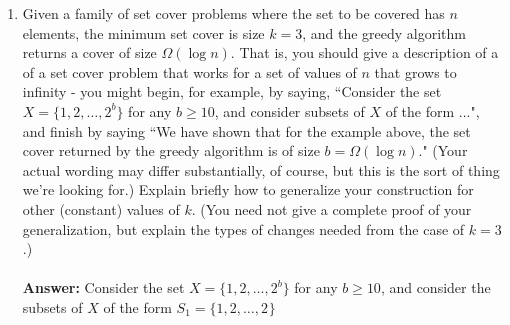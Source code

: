 \documentclass[tikz, 12pt]{scrartcl}
\begin{document}
\begin{enumerate}
\begin{algorithm}[th!]
	{\bf funcion} isInMST(V, E, e)\\
	NodesInMST = \{ \} \\
	\Return false
\caption{Algorithm to determine if an edge $e$ is in a MST}
\label{isInMSTAlgorithm}
\end{algorithm}
	
	
	\item Given a family of set cover problems where the set to be covered has $n$ elements, the minimum set cover is size $k = 3$, and the greedy algorithm returns a cover of size $\Omega(\log n)$. That is, you should give a description of a of a set cover problem that works for a set of values of $n$ that grows to infinity - you might begin, for example, by saying, ``Consider the set $X = \{1, 2, \ldots, 2^b \}$ for any $b \geq 10$, and consider subsets of $X$ of the form ...", and finish by saying ``We have shown that for the example above, the set cover returned by the greedy algorithm is of size $b = \Omega(\log n)$." (Your actual wording may differ substantially, of course, but this is the sort of thing we're looking for.) Explain briefly how to generalize your construction for other (constant) values of $k$. (You need not give a complete proof of your generalization, but  explain the types of changes needed from the case of $k = 3$.)\\
	\\
	\textbf{Answer: } Consider the set $X = \{ 1, 2, \ldots, 2^b\}$ for any $b \geq 10$, and consider the subsets of $X$ of the form $S_1 = \{1, 2, \ldots, 2^{} \}$
	

\end{enumerate}
\end{document}
